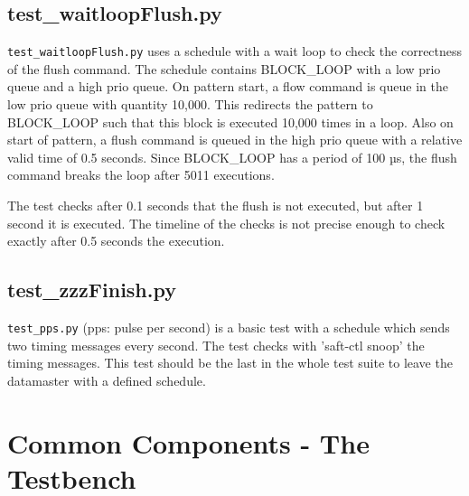 \documentclass[12pt,a4paper]{report}
\begin{document}
\section{test\_waitloopFlush.py}
\texttt{test\_waitloopFlush.py} uses a schedule with a wait loop to check
the correctness of the flush command. The schedule contains BLOCK\_LOOP with a low
prio queue and a high prio queue. On pattern start, a flow command is queue in
the low prio queue with quantity 10,000. This redirects the pattern to
BLOCK\_LOOP such that this block is executed 10,000 times in a loop. Also
on start of pattern, a flush command is queued in the high prio queue with a
relative valid time of 0.5 seconds. Since BLOCK\_LOOP has a period of 100 µs,
the flush command breaks the loop after 5011 executions.

The test checks after 0.1 seconds that the flush is not executed, but after 1 second
it is executed. The timeline of the checks is not precise enough to check
exactly after 0.5 seconds the execution.

\section{test\_zzzFinish.py}
\texttt{test\_pps.py} (pps: pulse per second) is a basic test with a
schedule which sends two timing messages every second. The test checks
with 'saft-ctl snoop' the timing messages. This test should be the last
in the whole test suite to leave the datamaster with a defined schedule.

\chapter{Common Components - The Testbench}
\end{document}
